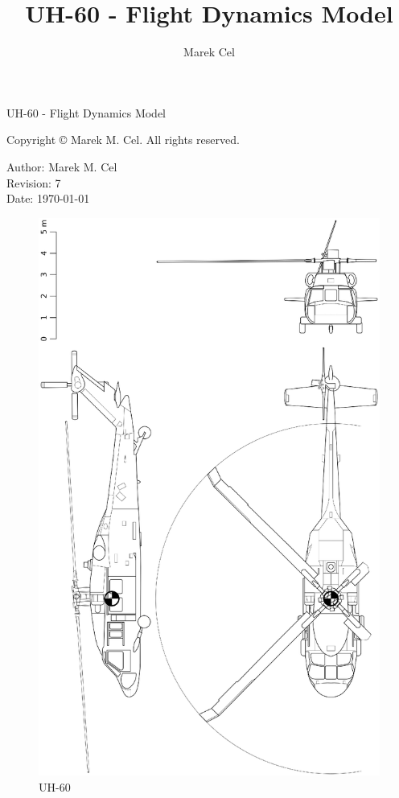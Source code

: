 \documentclass[12pt,a4paper]{article}
\title{UH-60 - Flight Dynamics Model}
\author{Marek Cel}
\date{}
\begin{document}
  
  \begin{titlepage}
    \centering
    {\huge UH-60 - Flight Dynamics Model\par}
  \end{titlepage}
  

  \noindent Copyright \copyright{} \the\year{} Marek M. Cel. All rights reserved.

  \noindent Author: Marek M. Cel \\
  Revision: 7 \\
  Date: \today

  
  
  \clearpage
  
  \begin{figure}[p]
    \centering
    \includegraphics[width=160mm]{eps/uh60_3view.eps}
    \caption{UH-60}
  \end{figure}
\end{document}
